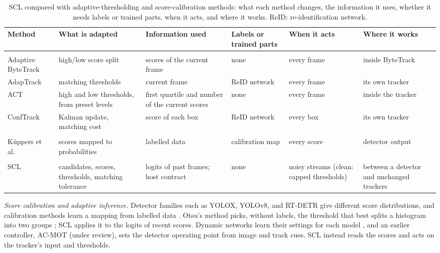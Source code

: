 \documentclass[pdflatex,sn-mathphys-num,iicol]{sn-jnl}
\newcommand{\scl}{SCL}
\newcommand{\priorctl}{an earlier controller, AC-MOT (under review),}
\begin{document}
\begin{table}[!tp]
\caption{\scl{} compared with adaptive-thresholding and score-calibration methods: what each method
changes, the information it uses, whether it needs labels or trained parts, when it acts, and where
it works. ReID: re-identification network.}
\label{tab:compare}
\centering\footnotesize
\setlength{\tabcolsep}{2.5pt}
\begin{tabular}{@{}>{\raggedright\arraybackslash}p{26mm}>{\raggedright\arraybackslash}p{33mm}>{\raggedright\arraybackslash}p{32mm}>{\raggedright\arraybackslash}p{17mm}>{\raggedright\arraybackslash}p{19mm}>{\raggedright\arraybackslash}p{24mm}@{}}
\toprule
Method & What is adapted & Information used & Labels or trained parts & When it acts & Where it works\\
\midrule
\multicolumn{6}{@{}l}{\textit{Adaptive thresholding}}\\
Adaptive ByteTrack \cite{ma2023adaptivebytetrack} & high/low score split & scores of the current frame & none & every frame & inside ByteTrack\\
AdapTrack \cite{shim2024adaptrack} & matching thresholds & current frame & ReID network & every frame & its own tracker\\
ACT \cite{act2026adaptive} & high and low thresholds, from preset levels & first quartile and number of the current scores & none & every frame & inside the tracker\\
ConfTrack \cite{jung2024conftrack} & Kalman update, matching cost & score of each box & ReID network & every box & its own tracker\\
\addlinespace[2pt]
\multicolumn{6}{@{}l}{\textit{Score calibration}}\\
K{\"u}ppers et al.\ \cite{kuppers2020detcalib} & scores mapped to probabilities & labelled data & calibration map & every score & detector output\\
\addlinespace[2pt]
\multicolumn{6}{@{}l}{\textit{This paper}}\\
\scl{} & candidates, scores, thresholds, matching tolerance & logits of past frames; host contract & none & noisy streams (clean: capped thresholds) & between a detector and unchanged trackers\\
\bottomrule
\end{tabular}
\end{table}


\emph{Score calibration and adaptive inference.} Detector families such as YOLOX, YOLOv8, and
RT-DETR give different score distributions, and calibration methods learn a mapping from labelled
data \cite{kuppers2020detcalib}. Otsu's method picks, without labels, the threshold that best splits a
histogram into two groups \cite{goh2018otsu}; \scl{} applies it to the logits of recent scores. Dynamic
networks learn their settings for each model \cite{han2022dynamic}, and \priorctl{}
sets the detector operating point from image and track cues. \scl{} instead
reads the scores and acts on the tracker's input and thresholds.
\end{document}
